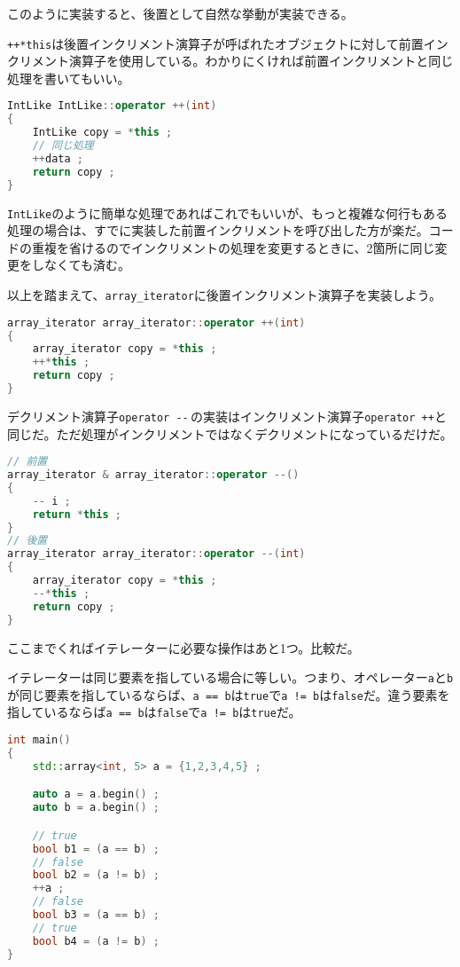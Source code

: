このように実装すると、後置として自然な挙動が実装できる。

\texttt{++*this}は後置インクリメント演算子が呼ばれたオブジェクトに対して前置インクリメント演算子を使用している。わかりにくければ前置インクリメントと同じ処理を書いてもいい。

\begin{lstlisting}[language={C++}]
IntLike IntLike::operator ++(int)
{
    IntLike copy = *this ;
    // 同じ処理
    ++data ;
    return copy ;
}
\end{lstlisting}

\texttt{IntLike}のように簡単な処理であればこれでもいいが、もっと複雑な何行もある処理の場合は、すでに実装した前置インクリメントを呼び出した方が楽だ。コードの重複を省けるのでインクリメントの処理を変更するときに、2箇所に同じ変更をしなくても済む。

以上を踏まえて、\texttt{array\_iterator}に後置インクリメント演算子を実装しよう。

\begin{lstlisting}[language={C++}]
array_iterator array_iterator::operator ++(int)
{
    array_iterator copy = *this ;
    ++*this ;
    return copy ;
}
\end{lstlisting}

デクリメント演算子\texttt{operator {-}{-}}\,の実装はインクリメント演算子\texttt{operator ++}と同じだ。ただ処理がインクリメントではなくデクリメントになっているだけだ。

\begin{lstlisting}[language={C++}]
// 前置
array_iterator & array_iterator::operator --()
{
    -- i ;
    return *this ;
}
// 後置
array_iterator array_iterator::operator --(int)
{
    array_iterator copy = *this ;
    --*this ;
    return copy ;
}
\end{lstlisting}

ここまでくればイテレーターに必要な操作はあと1つ。比較だ。

イテレーターは同じ要素を指している場合に等しい。つまり、オペレーター\texttt{a}と\texttt{b}が同じ要素を指しているならば、\texttt{a == b}は\texttt{true}で\texttt{a != b}は\texttt{false}だ。違う要素を指しているならば\texttt{a == b}は\texttt{false}で\texttt{a != b}は\texttt{true}だ。

\begin{lstlisting}[language={C++}]
int main()
{
    std::array<int, 5> a = {1,2,3,4,5} ;

    auto a = a.begin() ;
    auto b = a.begin() ;

    // true
    bool b1 = (a == b) ;
    // false
    bool b2 = (a != b) ;
    ++a ;
    // false
    bool b3 = (a == b) ;
    // true
    bool b4 = (a != b) ;
}
\end{lstlisting}

